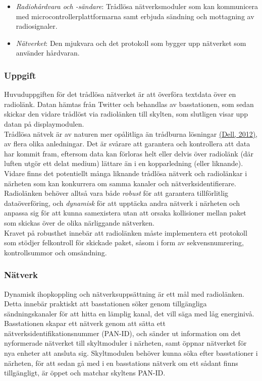 \documentclass[a4paper,11pt]{article}
\begin{document}
	\begin{itemize}
	\item {\it Radiohårdvara och -sändare}: Trådlösa nätverksmoduler som kan kommunicera med microcontrollerplattformarna samt erbjuda sändning och mottagning av radiosignaler.
    	\item {\it Nätverket}: Den mjukvara och det protokoll som bygger upp nätverket som använder hårdvaran.
	\end{itemize}
	
\subsubsection{Uppgift}
Huvuduppgiften för det trådlösa nätverket är att överföra textdata över en radiolänk. Datan hämtas från Twitter och behandlas av basstationen, som sedan skickar den vidare trådlöst via radiolänken till skylten, som slutligen visar upp datan på displaymodulen. \\

Trådlösa nätvek är av naturen mer opålitliga än trådburna lösningar \hyperref[dell]{(Dell, 2012)}, av flera olika anledningar. Det är svårare att garantera och kontrollera att data har kommit fram, eftersom data kan förloras helt eller delvis över radiolänk (där luften utgör ett delat medium) lättare än i en kopparledning (eller liknande). Vidare finns det potentiellt många liknande trådlösa nätverk och radiolänkar i närheten som kan konkurrera om samma kanaler och nätverksidentifierare. Radiolänken behöver alltså vara både {\it robust} för att garantera tillförlitlig dataöverföring, och {\it dynamisk} för att upptäcka andra nätverk i närheten och anpassa sig för att kunna samexistera utan att orsaka kollisioner mellan paket som skickas över de olika närliggande nätverken. \\

Kravet på robusthet innebär att radiolänken måste implementera ett protokoll som stödjer felkontroll för skickade paket, såsom i form av sekvensnumrering, kontrollsummor och omsändning.

\subsubsection{Nätverk}
Dynamisk ihopkoppling och nätverksuppsättning är ett mål med radiolänken. Detta innebär praktiskt att basstationen söker genom tillgängliga sändningskanaler för att hitta en lämplig kanal, det vill säga med låg energinivå. Basstationen skapar ett nätverk genom att sätta ett nätverksidentifikationsnummer (PAN-ID), och sänder ut information om det nyformerade nätverket till skyltmoduler i närheten, samt öppnar nätverket för nya enheter att ansluta sig. Skyltmodulen behöver kunna söka efter basstationer i närheten, för att sedan gå med i en basstations nätverk om ett sådant finns tillgängligt, är öppet och matchar skyltens PAN-ID. \\
\end{document}
